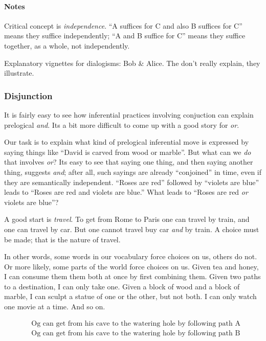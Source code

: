 \paragraph{Notes\\}

Critical concept is \textit{independence}. ``A suffices for C and also
B suffices for C'' means they suffice independently; ``A and B suffice
for C'' means they suffice together, as a whole, not independently.

Explanatory vignettes for dialogisms: Bob \& Alice. The don't really
explain, they illustrate.

\subsubsection{Disjunction}

It is fairly easy to see how inferential practices involving
conjuction can explain prelogical \textit{and}. Its a bit more
difficult to come up with a good story for \textit{or}.

Our task is to explain what kind of prelogical inferential move is
expressed by saying things like ``David is carved from wood or
marble''. But what can we \textit{do} that involves \textit{or}? Its
easy to see that saying one thing, and then saying another thing,
suggests \textit{and}; after all, such sayings are already
``conjoined'' in time, even if they are semantically independent.
``Roses are red'' followed by ``violets are blue'' leads to ``Roses
are red and violets are blue.'' What leads to ``Roses are red
\textit{or} violets are blue''?

A good start is \textit{travel}. To get from Rome to Paris one can
travel by train, and one can travel by car. But one cannot travel buy
car \textit{and} by train. A choice must be made; that is the nature
of travel.

In other words, some words in our vocabulary force choices on us,
others do not. Or more likely, some parts of the world force choices
on us. Given tea and honey, I can consume them them both at once by
first combining them. Given two paths to a destination, I can only
take one. Given a block of wood and a block of marble, I can sculpt a
statue of one or the other, but not both. I can only watch one movie
at a time. And so on.

\begin{align}
 & \text{Og can get from his cave to the watering hole by following path A} \\
 & \text{Og can get from his cave to the watering hole by following path B}
\end{align}


